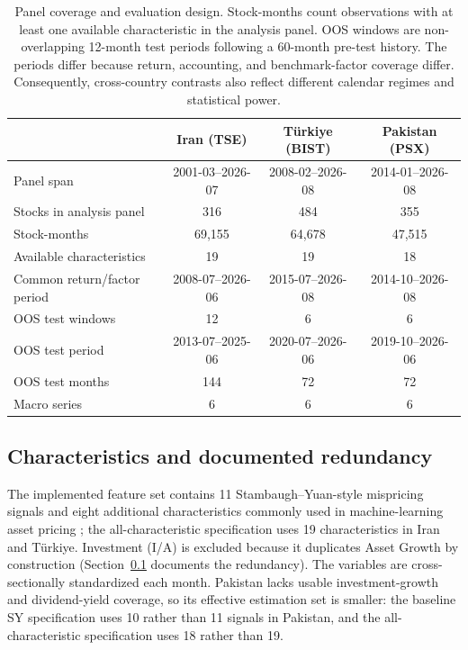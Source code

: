 \documentclass[12pt]{article}
\begin{document}
\begin{table}[htbp]
\centering
\caption{Panel coverage and evaluation design. Stock-months count observations with at least one available characteristic in the analysis panel. OOS windows are non-overlapping 12-month test periods following a 60-month pre-test history. The periods differ because return, accounting, and benchmark-factor coverage differ. Consequently, cross-country contrasts also reflect different calendar regimes and statistical power.}
\label{tab:coverage}
\small
\setlength{\tabcolsep}{4pt}
\begin{tabular}{lccc}
\toprule
 & Iran (TSE) & T\"urkiye (BIST) & Pakistan (PSX) \\
\midrule
Panel span & 2001-03--2026-07 & 2008-02--2026-08 & 2014-01--2026-08 \\
Stocks in analysis panel & 316 & 484 & 355 \\
Stock-months & 69,155 & 64,678 & 47,515 \\
Available characteristics & 19 & 19 & 18 \\
Common return/factor period & 2008-07--2026-06 & 2015-07--2026-08 & 2014-10--2026-08 \\
OOS test windows & 12 & 6 & 6 \\
OOS test period & 2013-07--2025-06 & 2020-07--2026-06 & 2019-10--2026-06 \\
OOS test months & 144 & 72 & 72 \\
Macro series & 6 & 6 & 6 \\
\bottomrule
\end{tabular}
\end{table}

\subsection{Characteristics and documented redundancy}\label{sec:chars}

The implemented feature set contains 11 Stambaugh--Yuan-style mispricing signals \citep{sy2017} and eight additional characteristics commonly used in machine-learning asset pricing \citep{gkx2020,cpz2024}; the all-characteristic specification uses 19 characteristics in Iran and T\"urkiye. Investment (I/A) is excluded because it duplicates Asset Growth by construction (Section~\ref{sec:chars} documents the redundancy). The variables are cross-sectionally standardized each month. Pakistan lacks usable investment-growth and dividend-yield coverage, so its effective estimation set is smaller: the baseline SY specification uses 10 rather than 11 signals in Pakistan, and the all-characteristic specification uses 18 rather than 19.
\end{document}
